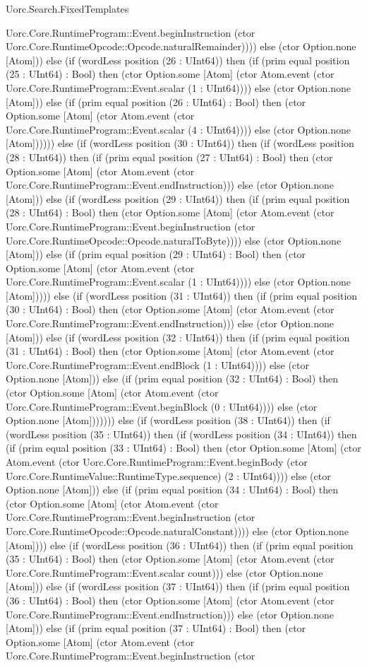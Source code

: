 \begin{lexlean}{Uorc.Search.FixedTemplates}
\begin{semanticmodule}
{Uorc.Core.RuntimeProgram::Event.beginInstruction (ctor Uorc.Core.RuntimeOpcode::Opcode.naturalRemainder)))) else (ctor Option.none [Atom])) else (if (wordLess position (26 : UInt64)) then (if (prim equal position (25 : UInt64) : Bool) then (ctor Option.some [Atom] (ctor Atom.event (ctor Uorc.Core.RuntimeProgram::Event.scalar (1 : UInt64)))) else (ctor Option.none [Atom])) else (if (prim equal position (26 : UInt64) : Bool) then (ctor Option.some [Atom] (ctor Atom.event (ctor Uorc.Core.RuntimeProgram::Event.scalar (4 : UInt64)))) else (ctor Option.none [Atom]))))) else (if (wordLess position (30 : UInt64)) then (if (wordLess position (28 : UInt64)) then (if (prim equal position (27 : UInt64) : Bool) then (ctor Option.some [Atom] (ctor Atom.event (ctor Uorc.Core.RuntimeProgram::Event.endInstruction))) else (ctor Option.none [Atom])) else (if (wordLess position (29 : UInt64)) then (if (prim equal position (28 : UInt64) : Bool) then (ctor Option.some [Atom] (ctor Atom.event (ctor Uorc.Core.RuntimeProgram::Event.beginInstruction (ctor Uorc.Core.RuntimeOpcode::Opcode.naturalToByte)))) else (ctor Option.none [Atom])) else (if (prim equal position (29 : UInt64) : Bool) then (ctor Option.some [Atom] (ctor Atom.event (ctor Uorc.Core.RuntimeProgram::Event.scalar (1 : UInt64)))) else (ctor Option.none [Atom])))) else (if (wordLess position (31 : UInt64)) then (if (prim equal position (30 : UInt64) : Bool) then (ctor Option.some [Atom] (ctor Atom.event (ctor Uorc.Core.RuntimeProgram::Event.endInstruction))) else (ctor Option.none [Atom])) else (if (wordLess position (32 : UInt64)) then (if (prim equal position (31 : UInt64) : Bool) then (ctor Option.some [Atom] (ctor Atom.event (ctor Uorc.Core.RuntimeProgram::Event.endBlock (1 : UInt64)))) else (ctor Option.none [Atom])) else (if (prim equal position (32 : UInt64) : Bool) then (ctor Option.some [Atom] (ctor Atom.event (ctor Uorc.Core.RuntimeProgram::Event.beginBlock (0 : UInt64)))) else (ctor Option.none [Atom])))))) else (if (wordLess position (38 : UInt64)) then (if (wordLess position (35 : UInt64)) then (if (wordLess position (34 : UInt64)) then (if (prim equal position (33 : UInt64) : Bool) then (ctor Option.some [Atom] (ctor Atom.event (ctor Uorc.Core.RuntimeProgram::Event.beginBody (ctor Uorc.Core.RuntimeValue::RuntimeType.sequence) (2 : UInt64)))) else (ctor Option.none [Atom])) else (if (prim equal position (34 : UInt64) : Bool) then (ctor Option.some [Atom] (ctor Atom.event (ctor Uorc.Core.RuntimeProgram::Event.beginInstruction (ctor Uorc.Core.RuntimeOpcode::Opcode.naturalConstant)))) else (ctor Option.none [Atom]))) else (if (wordLess position (36 : UInt64)) then (if (prim equal position (35 : UInt64) : Bool) then (ctor Option.some [Atom] (ctor Atom.event (ctor Uorc.Core.RuntimeProgram::Event.scalar count))) else (ctor Option.none [Atom])) else (if (wordLess position (37 : UInt64)) then (if (prim equal position (36 : UInt64) : Bool) then (ctor Option.some [Atom] (ctor Atom.event (ctor Uorc.Core.RuntimeProgram::Event.endInstruction))) else (ctor Option.none [Atom])) else (if (prim equal position (37 : UInt64) : Bool) then (ctor Option.some [Atom] (ctor Atom.event (ctor Uorc.Core.RuntimeProgram::Event.beginInstruction (ctor }
\end{semanticmodule}
\end{lexlean}
